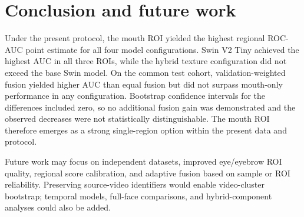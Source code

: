 \documentclass[a4paper]{elektr}
\begin{document}
\section{Conclusion and future work}
Under the present protocol, the mouth ROI yielded the highest regional ROC-AUC point estimate for all four model configurations. Swin V2 Tiny achieved the highest AUC in all three ROIs, while the hybrid texture configuration did not exceed the base Swin model. On the common test cohort, validation-weighted fusion yielded higher AUC than equal fusion but did not surpass mouth-only performance in any configuration. Bootstrap confidence intervals for the differences included zero, so no additional fusion gain was demonstrated and the observed decreases were not statistically distinguishable. The mouth ROI therefore emerges as a strong single-region option within the present data and protocol.

Future work may focus on independent datasets, improved eye/eyebrow ROI quality, regional score calibration, and adaptive fusion based on sample or ROI reliability. Preserving source-video identifiers would enable video-cluster bootstrap; temporal models, full-face comparisons, and hybrid-component analyses could also be added. 
\end{document}

